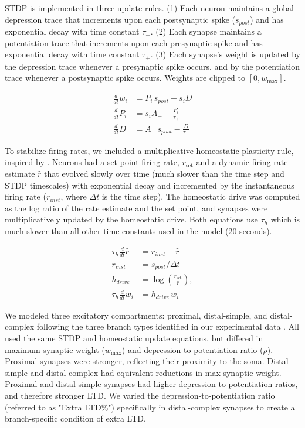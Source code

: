 STDP is implemented in three update rules. (1) Each neuron maintains a global depression trace that increments upon each postsynaptic spike ($s_{post}$) and has exponential decay with time constant $\tau_-$. (2) Each synapse maintains a potentiation trace that increments upon each presynaptic spike and has exponential decay with time constant $\tau_+$. (3) Each synapse's weight is updated by the depression trace whenever a presynaptic spike occurs, and by the potentiation trace whenever a postsynaptic spike occurs. Weights are clipped to $[0,w_{\max}]$.

\begin{align*}
    \frac{d}{dt}w_i &= P_i \, s_{post} - s_i D\\
    \frac{d}{dt}P_i &= s_i A_+ - \frac{P_i}{\tau_+} \\
    \frac{d}{dt}D &= A_- \, s_{post} - \frac{D}{\tau_-}
\end{align*}

To stabilize firing rates, we included a multiplicative homeostatic plasticity rule, inspired by \citep{turrigianoHomeostaticPlasticityDeveloping2004}. Neurons had a set point firing rate, $r_{\mathrm{set}}$ and a dynamic firing rate estimate $\hat r$ that evolved slowly over time (much slower than the time step and STDP timescales) with exponential decay and incremented by the instantaneous firing rate ($r_{inst}$, where $\Delta t$ is the time step). The homeostatic drive was computed as the log ratio of the rate estimate and the set point, and synapses were multiplicatively updated by the homeostatic drive. Both equations use $\tau_h$ which is much slower than all other time constants used in the model (20 seconds).

\begin{align*}
    \tau_h \frac{d}{dt}\hat r &= r_{inst} - \hat r \\
    r_{inst} &= s_{post} / \Delta t \\
    h_{drive} &= \log\!\left(\frac{r_{\mathrm{set}}}{\hat r}\right), \\
    \tau_h \frac{d}{dt} w_i &= h_{drive} \, w_i 
\end{align*}

We modeled three excitatory compartments: proximal, distal-simple, and distal-complex following the three branch types identified in our experimental data \citep{landauDendriticBranchStructure2022}. All used the same STDP and homeostatic update equations, but differed in maximum synaptic weight ($w_{\max}$) and depression-to-potentiation ratio ($\rho$). Proximal synapses were stronger, reflecting their proximity to the soma. Distal-simple and distal-complex had equivalent reductions in max synaptic weight. Proximal and distal-simple synapses had higher depression-to-potentiation ratios, and therefore stronger LTD. We varied the depression-to-potentiation ratio (referred to as "Extra LTD\%") specifically in distal-complex synapses to create a branch-specific condition of extra LTD.

